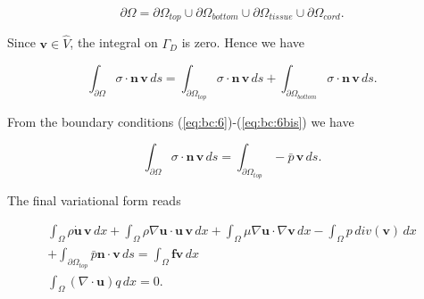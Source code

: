 \documentclass[a4paper,11pt,openright,twoside]{book}
\begin{document}
\begin{equation}
\partial \Omega = \partial \Omega_{top} \cup \partial \Omega_{bottom} \cup \partial \Omega_{tissue} \cup \partial \Omega_{cord}.
\end{equation}

Since $\mathbf{v} \in \hat{V}$, the integral on $\Gamma_D$ is zero. Hence we have

\begin{equation}
\int_{\partial \Omega}  \sigma \cdot \mathbf{n} \, \mathbf{v} \, ds
= \int_{\partial \Omega_{top}}   \sigma \cdot \mathbf{n} \, \mathbf{v} \, ds
+ \int_{\partial \Omega_{bottom}}  \sigma \cdot \mathbf{n} \, \mathbf{v} \, ds.
\end{equation}

From the boundary conditions (\ref{eq:bc:6})-(\ref{eq:bc:6bis}) we have

\begin{equation}
\int_{\partial \Omega}  \sigma \cdot \mathbf{n} \, \mathbf{v} \, ds
= \int_{\partial \Omega_{top}}  - \bar{p} \, \mathbf{v} \, ds.
\end{equation}

%

The final variational form reads

\begin{equation}
\label{eq:ns:4}
\begin{split}
\int_{\Omega} \rho \dot{\mathbf{u}} \, \mathbf{v} \, dx
+ \int_{\Omega} \rho \nabla \mathbf{u} \cdot \mathbf{u} \, \mathbf{v} \, dx
+ \int_{\Omega} \mu \nabla \mathbf{u} \cdot \nabla \mathbf{v} \, dx 
- \int_{\Omega} p \, div(\mathbf{v}) \, dx \\
+ \int_{\partial \Omega_{top}} \bar{p} \mathbf{n} \cdot \mathbf{v} \, ds
 =  \int_{\Omega} \mathbf{f} \mathbf{v} \, dx \\
\int_{\Omega}  (\nabla \cdot \mathbf{u}) q \, dx = 0.
\end{split}
\end{equation}
\end{document}
